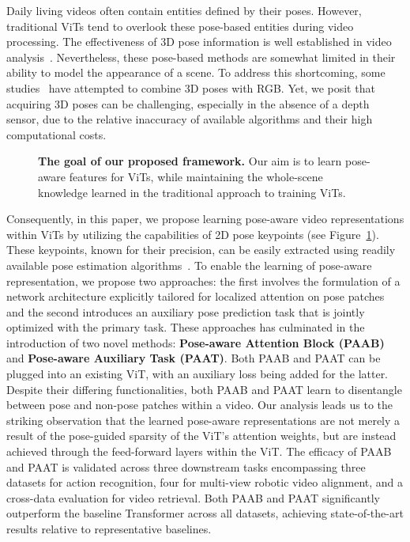\documentclass{article}
\begin{document}
Daily living videos often contain entities defined by their poses. However, traditional ViTs tend to overlook these pose-based entities during video processing. The effectiveness of 3D pose information is well established in video analysis~\cite{msaagcn, msg3d, skel_CNN_1, skel_CNN_2, skel_cnn_3}. Nevertheless, these pose-based methods are somewhat limited in their ability to model the appearance of a scene.
To address this shortcoming, some studies~\cite{glimpse, STA_hands, das2020vpn} have attempted to combine 3D poses with RGB. Yet, we posit that acquiring 3D poses can be challenging, especially in the absence of a depth sensor, due to the relative inaccuracy of available algorithms and their high computational costs.
\begin{figure}[H]
    \centering
    \caption{\textbf{The goal of our proposed framework.} Our aim is to learn pose-aware features for ViTs, while maintaining the whole-scene knowledge learned in the traditional approach to training ViTs.}
    \label{fig:intro} \vspace{-0.15in}
\end{figure}
Consequently, in this paper, we propose learning pose-aware video representations within ViTs by utilizing the capabilities of 2D pose keypoints (see Figure~\ref{fig:intro}). These keypoints, known for their precision, can be easily extracted using readily available pose estimation algorithms~\cite{OpenPose}. To enable the learning of pose-aware representation, we propose two approaches: the first involves the formulation of a network architecture explicitly tailored for localized attention on pose patches and the second introduces an auxiliary pose prediction task that is jointly optimized with the primary task. These approaches has culminated in the introduction of two novel methods: \textbf{Pose-aware Attention Block (PAAB)} and \textbf{Pose-aware Auxiliary Task (PAAT)}. Both PAAB and PAAT can be plugged into an existing ViT, with an auxiliary loss being added for the latter. Despite their differing functionalities, both PAAB and PAAT learn to disentangle between pose and non-pose patches within a video. Our analysis leads us to the striking observation that the learned pose-aware representations are not merely a result of the pose-guided sparsity of the ViT's attention weights, but are instead achieved through the feed-forward layers within the ViT. The efficacy of PAAB and PAAT is validated across three downstream tasks encompassing three datasets for action recognition, four for multi-view robotic video alignment, and a cross-data evaluation for video retrieval. Both PAAB and PAAT significantly outperform the baseline Transformer across all datasets, achieving state-of-the-art results relative to representative baselines.
\end{document}
